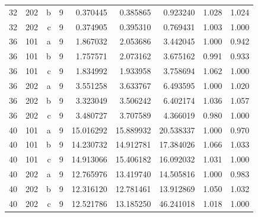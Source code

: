 \begin{tabular}{rrrrrrrrr}
32 & 202 & b & 9 & 0.370445 & 0.385865 & 0.923240 & 1.028 & 1.024 \\
32 & 202 & c & 9 & 0.374905 & 0.395310 & 0.769431 & 1.003 & 1.000 \\
36 & 101 & a & 9 & 1.867032 & 2.053686 & 3.442045 & 1.000 & 0.942 \\
36 & 101 & b & 9 & 1.757571 & 2.073162 & 3.675162 & 0.991 & 0.933 \\
36 & 101 & c & 9 & 1.834992 & 1.933958 & 3.758694 & 1.062 & 1.000 \\
36 & 202 & a & 9 & 3.551258 & 3.633767 & 6.493595 & 1.000 & 1.020 \\
36 & 202 & b & 9 & 3.323049 & 3.506242 & 6.402174 & 1.036 & 1.057 \\
36 & 202 & c & 9 & 3.480727 & 3.707589 & 4.366019 & 0.980 & 1.000 \\
40 & 101 & a & 9 & 15.016292 & 15.889932 & 20.538337 & 1.000 & 0.970 \\
40 & 101 & b & 9 & 14.230732 & 14.912781 & 17.384026 & 1.066 & 1.033 \\
40 & 101 & c & 9 & 14.913066 & 15.406182 & 16.092032 & 1.031 & 1.000 \\
40 & 202 & a & 9 & 12.765976 & 13.419740 & 14.505816 & 1.000 & 0.983 \\
40 & 202 & b & 9 & 12.316120 & 12.781461 & 13.912869 & 1.050 & 1.032 \\
40 & 202 & c & 9 & 12.521786 & 13.185250 & 46.241018 & 1.018 & 1.000 \\
\bottomrule\end{tabular}

